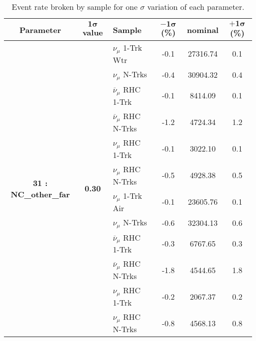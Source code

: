 \addtocounter{table}{-1}
\begin{table}[ht!]
\centering
\begin{tabular}{ c  c  l  c  c  c }
\midrule[1.3pt]
\textbf{Parameter} & \textbf{$\mathbf{1\sigma}$ value} & \textbf{Sample} & \textbf{$\mathbf{-1\sigma}$ (\%)}  &  \textbf{nominal}  &  \textbf{$\mathbf{+1\sigma}$ (\%)} \\
\midrule[1.3pt]
\multirow{12}{*}{\textbf{31 : NC\_other\_far}} & \multirow{12}{*}{\textbf{0.30}} & $\nu_\mu$ 1-Trk Wtr &   -0.1 &  27316.74 &   0.1 \\ 
 &  & $\nu_\mu$ N-Trks &   -0.4 &  30904.32 &   0.4 \\ 
 &  & $\overline{\nu}_\mu$ RHC 1-Trk &   -0.1 &  8414.09 &   0.1 \\ 
 &  & $\overline{\nu}_\mu$ RHC N-Trks &   -1.2 &  4724.34 &   1.2 \\ 
 &  & $\nu_\mu$ RHC 1-Trk &   -0.1 &  3022.10 &   0.1 \\ 
 &  & $\nu_\mu$ RHC N-Trks &   -0.5 &  4928.38 &   0.5 \\ 
 &  & $\nu_\mu$ 1-Trk Air &   -0.1 &  23605.76 &   0.1 \\ 
 &  & $\nu_\mu$ N-Trks &   -0.6 &  32304.13 &   0.6 \\ 
 &  & $\overline{\nu}_\mu$ RHC 1-Trk &   -0.3 &  6767.65 &   0.3 \\ 
 &  & $\overline{\nu}_\mu$ RHC N-Trks &   -1.8 &  4544.65 &   1.8 \\ 
 &  & $\nu_\mu$ RHC 1-Trk &   -0.2 &  2067.37 &   0.2 \\ 
 &  & $\nu_\mu$ RHC N-Trks &   -0.8 &  4568.13 &   0.8 \\ 
\midrule[1.3pt]
\end{tabular}
\centering
\caption{Event rate broken by sample for one $\sigma$ variation of each parameter.}
\end{table}
\addtocounter{table}{-1}
